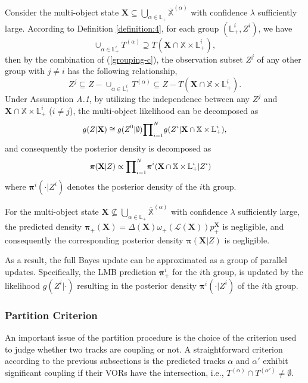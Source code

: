 \documentclass[journal]{IEEEtran}
\newcommand{\bX}{{\mathbf X}}
\newcommand{\bpi}{{\boldsymbol\pi}}
\begin{document}
{Consider the multi-object state $\bX\subseteq\bigcup_{\alpha\in\mathbb{L}_{+}}\overline{\mathbb{X}}^{(\alpha)}$ with  confidence $\lambda$ sufficiently large. According to Definition \ref{definition:4}, for each group $(\mathbb{L}_{+}^{i},Z^{i})$, we have 
$$\cup_{\alpha\in\mathbb{L}_{+}^{i}}T^{(\alpha)}\supseteq T(\bX\cap\mathbb{X}\times\mathbb{L}_{+}^{i}),$$ then by the combination of (\ref{grouping-c}), the observation subset $Z^{j}$ of  any other group with $j\neq i$ has the following relationship,
$$Z^{j}\subseteq Z-\cup_{\alpha\in\mathbb{L}_{+}^{i}}T^{(\alpha)}\subseteq Z-T(\bX\cap\mathbb{X}\times\mathbb{L}_{+}^{i}).$$ Under Assumption \textit{A.1}, by utilizing the independence between any $Z^{j}$ and $\bX\cap\mathbb{X}\times\mathbb{L}_{+}^{i}$ ($i\neq j$), the multi-object  likelihood can be  decomposed 
as
\begin{equation} 
{\small
\begin{split}
g(Z|\bX)\cong g(Z^{0}|\emptyset){\prod}_{i=1}^N g(Z^{i}|\bX\cap\mathbb{X}\times\mathbb{L}_+^{i}),
\end{split}}
\end{equation}
and consequently the posterior density is decomposed as
\begin{equation}\label{De-Posterior}
{\small
\begin{split}
&\bpi(\bX|Z)
\propto {\prod}_{i=1}^N \bpi^{i}(\bX\cap\mathbb{X}\times\mathbb{L}_+^{i}|Z^{i})
\end{split}}
\end{equation}
where $\bpi^{i}(\cdot|Z^{i})$ denotes the posterior density of the $i$th group.

For the multi-object state $\bX\nsubseteq\bigcup_{\alpha\in\mathbb{L}_{+}}\overline{\mathbb{X}}^{(\alpha)}$ with  confidence $\lambda$ sufficiently large, the predicted density $ \bpi_{+}(\bX)=\Delta(\bX)\omega_{+}(\mathcal{L}(\bX))p_{+}^{\bX}$ is negligible, and consequently the corresponding posterior density $\bpi(\bX|Z)$ is negligible.


As a result,  the full Bayes update  can be approximated as  a group  of parallel  updates.  Specifically, the LMB prediction $\bpi^{i}_+$ for the $i$th group, 
is updated by the  likelihood $g(Z^{i}|\cdot)$  resulting in the posterior density $\bpi^{i}(\cdot|Z^{i})$ of the $i$th group.
\subsubsection{Partition Criterion}
An important issue of the partition procedure is  the choice of the criterion used to  judge whether two tracks are coupling or not.  A straightforward criterion according to the previous subsections  is 
the  predicted tracks $\alpha$ and $\alpha'$ exhibit significant coupling  if their VORs have the intersection, i.e., $T^{(\alpha)}\cap T^{(\alpha')}\neq\emptyset.$





}
\end{document}
